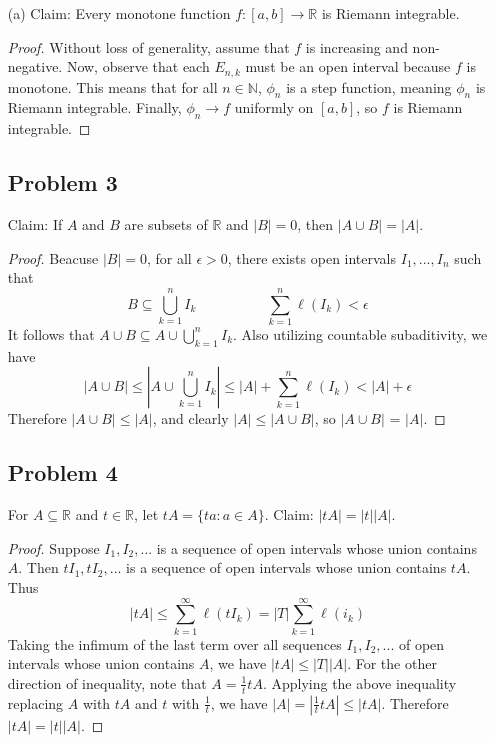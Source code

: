 \documentclass[12pt]{article}
\begin{document}
\begin{itemize}
\begin{proof}
        Therefore $\phi_n \to f$ uniformly on $[a,b]$.
    \end{proof}

    \item[(a)] Claim: Every monotone function $f: [a,b] \to \mathbb{R}$ is Riemann integrable.
    
    \begin{proof}
        Without loss of generality, assume that $f$ is increasing and non-negative. Now, observe that each $E_{n,k}$ must be an open interval because $f$ is monotone. This means that for all $n \in \mathbb{N}$, $\phi_n$ is a step function, meaning $\phi_n$ is Riemann integrable. Finally, $\phi_n \to f$ uniformly on $[a,b]$, so $f$ is Riemann integrable.
    \end{proof}

\subsection*{Problem 3} Claim: If $A$ and $B$ are subsets of $\mathbb{R}$ and $|B|=0$, then $|A \cup B| = |A|$.

\begin{proof}
    Beacuse $|B|=0$, for all $\epsilon > 0$, there exists open intervals $I_1,..., I_n$ such that $$B \subseteq \bigcup_{k = 1}^n I_k \hspace{5em}\sum_{k = 1}^n \ell(I_k) < \epsilon$$ It follows that $A \cup B \subseteq A \cup \bigcup_{k=1}^n I_k$. Also utilizing countable subaditivity, we have $$|A \cup B| \leq |A \cup \bigcup_{k=1}^n I_k| \leq |A| + \sum_{k=1}^n \ell(I_k) < |A| + \epsilon$$ Therefore $|A \cup B| \leq |A|$, and clearly $|A| \leq |A \cup B|$, so $|A \cup B|$ = $|A|$.
\end{proof}

\subsection*{Problem 4}

For $A \subseteq \mathbb{R}$ and $t \in \mathbb{R}$, let $tA=\{ta:a \in A\}$.
Claim: $|tA| = |t||A|$.

\begin{proof}
    Suppose $I_1, I_2,...$ is a sequence of open intervals whose union contains $A$. Then $tI_1, tI_2,...$ is a sequence of open intervals whose union contains $tA$. Thus $$|tA| \leq \sum_{k=1}^\infty \ell(tI_k) = |T| \sum_{k=1}^\infty \ell(i_k)$$ Taking the infimum of the last term over all sequences $I_1, I_2,...$ of open intervals whose union contains $A$, we have $|tA| \leq |T||A|$. For the other direction of inequality, note that $A = \frac{1}{t}tA$. Applying the above inequality replacing $A$ with $tA$ and $t$ with $\frac{1}{t}$, we have $|A| = |\frac{1}{t}tA| \leq |tA|$. Therefore $|tA| = |t||A|$.
\end{proof}
\end{itemize}
\end{document}
